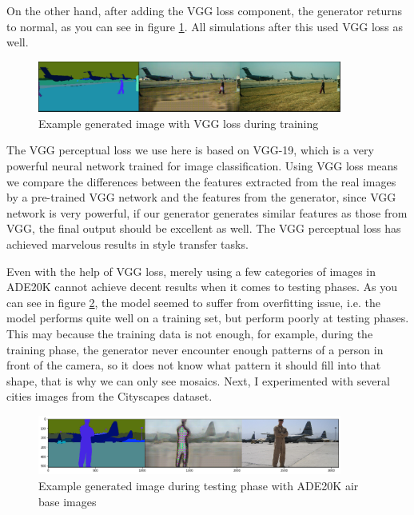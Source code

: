 On the other hand, after adding the VGG loss component, the generator returns to normal, as you 
can see in figure \ref{fig:with-VGG}. All simulations after this used VGG loss as well.
\begin{figure}[H]
    \begin{center}
    \includegraphics[width=10cm]{figures/with-VGG}
    \end{center}
    \caption{Example generated image with VGG loss during training}
    \label{fig:with-VGG}
\end{figure}

The VGG perceptual loss we use here is based on VGG-19\cite{articleVGG}, which is a very powerful
neural network trained for image classification. Using VGG loss means we compare the differences 
between the features extracted from the real images by a pre-trained VGG network and the features from 
the generator, since VGG network is very powerful, if our generator generates similar features as 
those from VGG, the final output should be excellent as well. The VGG perceptual loss has achieved 
marvelous results \cite{DBLP:journals/corr/JohnsonAL16} in style transfer tasks.     

Even with the help of VGG loss, merely using a few categories of images in ADE20K cannot achieve 
decent results when it comes to testing phases. As you can see in figure \ref{fig:ADE20K-test}, 
the model seemed to suffer from overfitting issue, i.e. the model performs quite well on 
a training set, but perform poorly at testing phases. This may because the training data is not 
enough, for example, during the training phase, the generator never encounter enough patterns of 
a person in front of the camera, so it does not know what pattern it should fill into that 
shape, that is why we can only see mosaics. Next, I experimented with several cities images 
from the Cityscapes dataset.
\begin{figure}[H]
    \begin{center}
    \includegraphics[width=10cm]{figures/ade20k-test}
    \end{center}
    \caption{Example generated image during testing phase with ADE20K air base images}
    \label{fig:ADE20K-test}
\end{figure}

